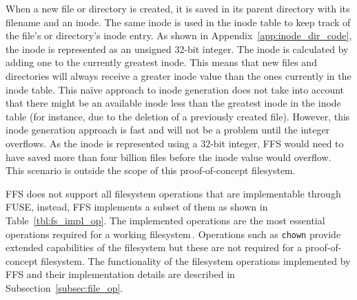 When a new file or directory is created, it is saved in its parent directory with its filename and an inode. The same inode is used in the inode table to keep track of the file's or directory's inode entry. As shown in Appendix~\ref{app:inode_dir_code}, the inode is represented as an unsigned \mbox{32-bit} integer. The inode is calculated by adding one to the currently greatest inode. This means that new files and directories will always receive a greater inode value than the ones currently in the inode table. This naïve approach to inode generation does not take into account that there might be an available inode less than the greatest inode in the inode table (for instance, due to the deletion of a previously created file). However, this inode generation approach is fast and will not be a problem until the integer overflows. As the inode is represented using a \mbox{32-bit} integer, \gls{FFS} would need to have saved more than four billion files before the inode value would overflow. This scenario is outside the scope of this \mbox{proof-of-concept} filesystem.

\gls{FFS} does not support all filesystem operations that are implementable through \gls{FUSE}, instead, \gls{FFS} implements a subset of them as shown in Table~\ref{tbl:fs_impl_op}. The implemented operations are the most essential operations required for a working filesystem\,\cite{kuenningCS135FUSEDocumentation2010}. Operations such as \texttt{chown} provide extended capabilities of the filesystem but these are not required for a \mbox{proof-of-concept} filesystem. The functionality of the filesystem operations implemented by \gls{FFS} and their implementation details are described in Subsection~\ref{subsec:file_op}. 

